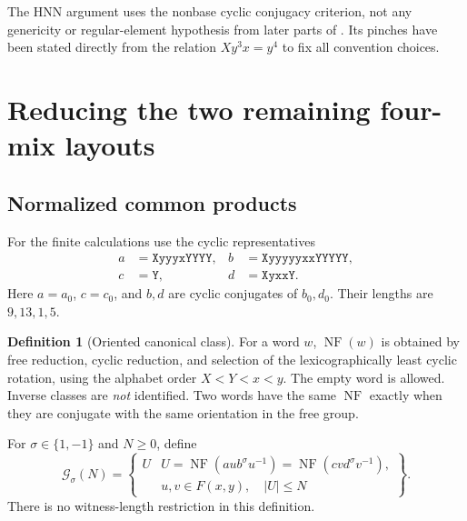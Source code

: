 \documentclass[11pt,a4paper]{article}
\theoremstyle{definition}\newtheorem{definition}[theorem]{Definition}
\theoremstyle{remark}\newtheorem{remark}[theorem]{Remark}
\newcommand{\NF}{\operatorname{NF}}
\newcommand{\word}[1]{\texttt{#1}}
\begin{document}
The HNN argument uses the nonbase cyclic conjugacy criterion, not any genericity or regular-element hypothesis from later parts of \cite{BMR}. Its pinches have been stated directly from the relation $Xy^3x=y^4$ to fix all convention choices.

\section{Reducing the two remaining four-mix layouts}\label{sec:gate}
\subsection{Normalized common products}
For the finite calculations use the cyclic representatives
\begin{align*}
 a&=\word{XyyyxYYYY},& b&=\word{XyyyyyxxYYYYY},\\
 c&=\word{Y},& d&=\word{XyxxY}.
\end{align*}
Here $a=a_0$, $c=c_0$, and $b,d$ are cyclic conjugates of $b_0,d_0$. Their lengths are $9,13,1,5$.

\begin{definition}[Oriented canonical class]
For a word $w$, $\NF(w)$ is obtained by free reduction, cyclic reduction, and selection of the lexicographically least cyclic rotation, using the alphabet order $X<Y<x<y$. The empty word is allowed. Inverse classes are \emph{not} identified. Two words have the same $\NF$ exactly when they are conjugate with the same orientation in the free group.
\end{definition}

For $\sigma\in\{1,-1\}$ and $N\ge0$, define
\[
\mathcal G_\sigma(N)=
\left\{\begin{array}{l|l}
U & U=\NF(aub^\sigma u^{-1})=\NF(cvd^\sigma v^{-1}),\\[-2pt]
  & u,v\in F(x,y),\quad |U|\le N
\end{array}\right\}.
\]
There is no witness-length restriction in this definition.
\end{document}

